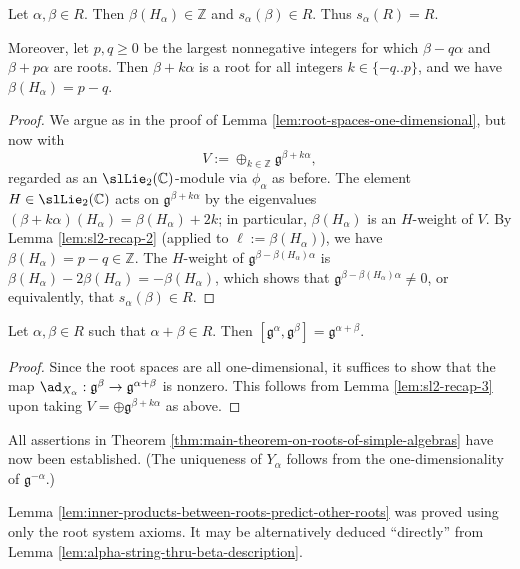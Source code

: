 \documentclass[reqno]{amsart} 
\begin{document}
\begin{lemma}\label{lem:alpha-string-thru-beta-description}
  Let $\alpha, \beta \in R$.  Then $\beta(H_\alpha) \in \mathbb{Z}$ and $s_\alpha(\beta) \in R$.  Thus $s_\alpha(R) = R$.

  Moreover, let $p,q \geq 0$ be the largest nonnegative integers for which $\beta - q \alpha$ and $\beta + p \alpha$ are roots.  Then $\beta + k \alpha$ is a root for all integers $k \in \{-q..p\}$, and we have $\beta(H_\alpha) = p- q$.
\end{lemma}
\begin{proof}
  We argue as in the proof of Lemma \ref{lem:root-spaces-one-dimensional}, but now with
  \begin{equation*}
    V := \oplus_{k \in \mathbb{Z}} \mathfrak{g}^{\beta + k \alpha},
  \end{equation*}
  regarded as an $\slLie_2(\mathbb{C})$-module via $\phi_\alpha$ as before.  The element $H \in \slLie_2(\mathbb{C})$ acts on $\mathfrak{g}^{\beta + k \alpha}$ by the eigenvalues $(\beta + k \alpha)(H_\alpha) = \beta(H_\alpha) + 2 k$; in particular, $\beta(H_\alpha)$ is an $H$-weight of $V$.  By Lemma \ref{lem:sl2-recap-2} (applied to $\ell := \beta(H_\alpha)$), we have $\beta(H_\alpha) = p - q \in \mathbb{Z}$.  The $H$-weight of $\mathfrak{g}^{\beta - \beta(H_\alpha) \alpha}$ is $\beta(H_\alpha) - 2 \beta(H_\alpha) = - \beta(H_\alpha)$, which shows that $\mathfrak{g}^{\beta - \beta(H_\alpha) \alpha} \neq 0$, or equivalently, that $s_\alpha(\beta) \in R$.
\end{proof}

\begin{lemma}
  Let $\alpha,\beta \in R$ such that $\alpha + \beta \in R$.  Then $[\mathfrak{g}^\alpha,\mathfrak{g}^\beta] = \mathfrak{g}^{\alpha+\beta}$.
\end{lemma}
\begin{proof}
  Since the root spaces are all one-dimensional, it suffices to show that the map $\ad_{X_\alpha} : \mathfrak{g}^\beta \rightarrow \mathfrak{g}^{\alpha+\beta}$ is nonzero.  This follows from Lemma \ref{lem:sl2-recap-3} upon taking $V = \oplus \mathfrak{g}^{\beta + k \alpha}$ as above.
\end{proof}

All assertions in Theorem \ref{thm:main-theorem-on-roots-of-simple-algebras} have now been established.  (The uniqueness of $Y_\alpha$ follows from the one-dimensionality of $\mathfrak{g}^{-\alpha}$.)


\begin{remark}
  Lemma \ref{lem:inner-products-between-roots-predict-other-roots} was proved using only the root system axioms.  It may be alternatively deduced ``directly'' from Lemma \ref{lem:alpha-string-thru-beta-description}.
\end{remark}
\end{document}
